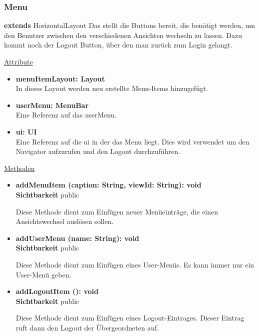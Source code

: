 \subsubsection{Menu}\label{Menu}
\textbf{extends}  HorizontalLayout \newline
Das  stellt die Buttons bereit, die benötigt werden, um den Benutzer zwischen den verschiedenen Ansichten wechseln zu lassen. Dazu kommt noch der Logout Button, über den man zurück zum Login gelangt.
\newline

\underline{Attribute}
\begin{itemize}
\itemsep0pt

\item \textbf{menuItemLayout: Layout} \hfill\\ 
In dieses Layout werden neu erstellte Menu-Items hinzugefügt.

\item \textbf{userMenu: MenuBar} \hfill\\ 
Eine Referenz auf das userMenu.

\item \textbf{ui: UI} \hfill\\ 
Eine Referenz auf die ui in der das Menu liegt. Dies wird verwendet um den Navigator aufzurufen und den Logout durchzuführen.

\end{itemize}

\underline{Methoden}
\begin{itemize}
\itemsep0pt
\item \textbf{addMenuItem (caption: String, viewId: String): void}\hfill\\
\textbf{Sichtbarkeit} public

Diese Methode dient zum Einfügen neuer Menüeinträge, die einen Ansichtswechsel auslösen sollen.

\item \textbf{addUserMenu (name: String): void}\hfill\\
\textbf{Sichtbarkeit} public

Diese Methode dient zum Einfügen eines User-Menüs. Es kann immer nur ein User-Menü geben.

\item \textbf{addLogoutItem (): void}\hfill\\
\textbf{Sichtbarkeit} public

Diese Methode dient zum Einfügen eines Logout-Eintrages. Dieser Eintrag ruft dann den Logout der Übergeordneten  auf.

\end{itemize}
